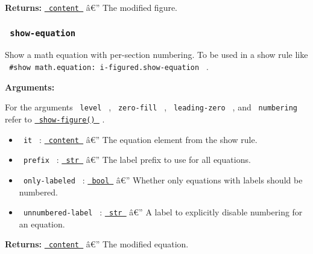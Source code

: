\textbf{Returns:}
\href{https://typst.app/docs/reference/foundations/content/}{\texttt{\ content\ }}
â€'' The modified figure.

\subsubsection{\texorpdfstring{\texttt{\ show-equation\ }}{ show-equation }}\label{show-equation}

Show a math equation with per-section numbering. To be used in a show
rule like \texttt{\ \#show\ math.equation:\ i-figured.show-equation\ } .

\begin{Shaded}
\begin{Highlighting}[]
\end{Highlighting}
\end{Shaded}

\textbf{Arguments:}

For the arguments \texttt{\ level\ } , \texttt{\ zero-fill\ } ,
\texttt{\ leading-zero\ } , and \texttt{\ numbering\ } refer to
\href{https://github.com/typst/packages/raw/main/packages/preview/i-figured/0.2.4/\#show-figure}{\texttt{\ show-figure()\ }}
.

\begin{itemize}
\tightlist
\item
  \texttt{\ it\ } :
  \href{https://typst.app/docs/reference/foundations/content/}{\texttt{\ content\ }}
  â€'' The equation element from the show rule.
\item
  \texttt{\ prefix\ } :
  \href{https://typst.app/docs/reference/foundations/str/}{\texttt{\ str\ }}
  â€'' The label prefix to use for all equations.
\item
  \texttt{\ only-labeled\ } :
  \href{https://typst.app/docs/reference/foundations/bool/}{\texttt{\ bool\ }}
  â€'' Whether only equations with labels should be numbered.
\item
  \texttt{\ unnumbered-label\ } :
  \href{https://typst.app/docs/reference/foundations/str/}{\texttt{\ str\ }}
  â€'' A label to explicitly disable numbering for an equation.
\end{itemize}

\textbf{Returns:}
\href{https://typst.app/docs/reference/foundations/content/}{\texttt{\ content\ }}
â€'' The modified equation.

